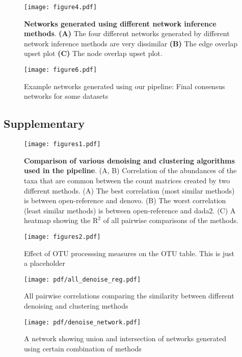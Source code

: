 \begin{figure}[h]
  \centering
  \texttt{[image: figure4.pdf]}
  \caption{
    \textbf{Networks generated using different network inference methods}.
    \textbf{(A)} The four different networks generated by different network inference methods are very dissimilar
    \textbf{(B)} The edge overlap upset plot
    \textbf{(C)} The node overlap upset plot.
  }
  \label{fig:figure4}
\end{figure}

\begin{figure}[h]
  \centering
  \texttt{[image: figure6.pdf]}
  \caption{Example networks generated using our pipeline: Final consensus networks for some datasets}
  \label{fig:figure6}
\end{figure}

\FloatBarrier

\subsection*{Supplementary}%

\begin{figure}[h]
  \centering
  \texttt{[image: figures1.pdf]}
  \caption{
    \textbf{Comparison of various denoising and clustering algorithms used in the pipeline}.
    (A, B) Correlation of the abundances of the taxa that are common between the count matrices created by two different methods.
    (A) The best correlation (most similar methods) is between open-reference and denovo.
    (B) The worst correlation (least similar methods) is between open-reference and dada2.
    (C) A heatmap showing the $\mathrm{R}^2$ of all pairwise comparisons of the methods.
  }
  \label{fig:figures1}
\end{figure}

\begin{figure}[h]
  \centering
  \texttt{[image: figures2.pdf]}
  \caption{Effect of OTU processsing measures on the OTU table. This is just a placeholder}
  \label{fig:figures2}
\end{figure}

\begin{figure}[h]
  \centering
  \texttt{[image: pdf/all\_denoise\_reg.pdf]}
  \caption{All pairwise correlations comparing the similarity between different denoising and clustering methods}
  \label{fig:figures2}
\end{figure}

\begin{figure}[h]
  \centering
  \texttt{[image: pdf/denoise\_network.pdf]}
  \caption{A network showing union and intersection of networks generated using certain combination of methods}
  \label{fig:pdf/denoise_network}
\end{figure}




